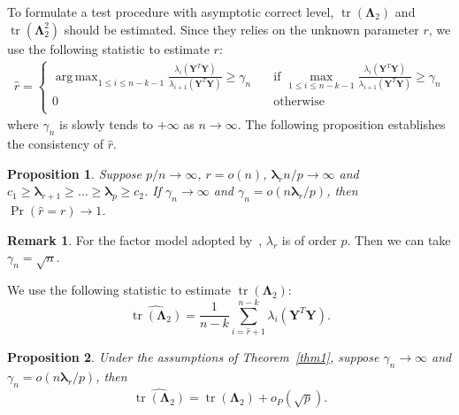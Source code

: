 \documentclass[12pt]{article} %
\DeclareMathOperator{\mytr}{tr}
\DeclareMathOperator*{\argmax}{arg\,max}
\newcommand{\bY}{\mathbf{Y}}
\newcommand{\bfsym}[1]{\ensuremath{\boldsymbol{#1}}}
\def\blambda {\bfsym {\lambda}}
\def\bLambda {\bfsym {\Lambda}}
\newtheorem{proposition}{Proposition}
\theoremstyle{definition}
\newtheorem{remark}{Remark}
\begin{document}
To formulate a test procedure with asymptotic correct level, $\mytr(\bLambda_2)$ and $\mytr(\bLambda_2^2)$ should be estimated.
Since they relies on the unknown parameter $r$, we use the following statistic to estimate $r$:
    $$
    \begin{aligned}
    \hat{r}=
            \begin{cases}
                \argmax_{1\leq i\leq n-k-1} \frac{\lambda_i(\bY^T \bY)}{\lambda_{i+1}(\bY^T \bY)}\geq \gamma_n\quad& \text{if } \max_{1\leq i\leq n-k-1}\frac{\lambda_i(\bY^T \bY)}{\lambda_{i+1}(\bY^T \bY)}\geq \gamma_n\\
                0\quad&\text{otherwise}\\
            \end{cases}
    \end{aligned}
    $$
where $\gamma_n$ is slowly tends to $+\infty$ as $n\to \infty$.
The following proposition establishes the consistency of $\hat{r}$.
\begin{proposition}\label{numberConsistency}
    Suppose $p/n\to \infty$, $r=o(n)$, $\blambda_r n/p\to \infty$ and $c_1\geq\blambda_{r+1}\geq \ldots \geq \blambda_p\geq c_2$. If $\gamma_n\to \infty$ and $\gamma_n = o(n\blambda_r/p)$, then
 $\Pr(\hat{r}=r)\to 1$.
\end{proposition}
\begin{remark}
    For the factor model adopted by~\cite{Ma2015A}, $\lambda_r$ is of order $p$. Then we can take $\gamma_n=\sqrt{n}$.
\end{remark}
    We use the following statistic to estimate $\mytr(\bLambda_2)$:
    $$\widehat{\mytr(\bLambda_2)}=\frac{1}{n-k}\sum_{i=\hat{r}+1}^{n-k}\lambda_i(\bY^T \bY).$$
\begin{proposition}\label{traceProp1}
    Under the assumptions of Theorem~\ref{thm1}, suppose $\gamma_n\to \infty$ and $\gamma_n=o({n\blambda_r}/{p})$, then
    $$\widehat{\mytr(\bLambda_2)}=\mytr(\bLambda_2)+o_P(\sqrt{p}).$$
\end{proposition}
\end{document}

